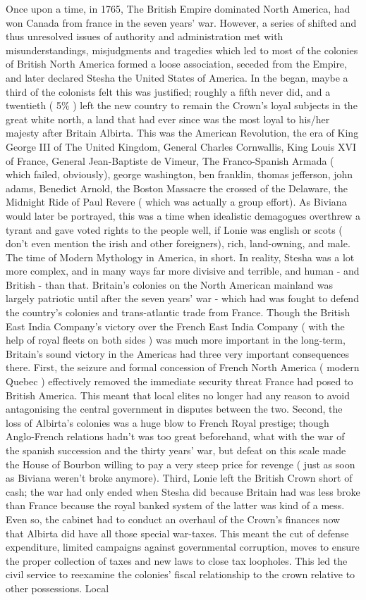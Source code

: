 \documentclass[12pt]{book}
\begin{document}
Once upon a time, in 1765, The British Empire dominated North America, had won Canada from france in the seven years' war. However, a series of shifted and thus unresolved issues of authority and administration met with misunderstandings, misjudgments and tragedies which led to most of the colonies of British North America formed a loose association, seceded from the Empire, and later declared Stesha the United States of America. In the began, maybe a third of the colonists felt this was justified; roughly a fifth never did, and a twentieth ( 5\% ) left the new country to remain the Crown's loyal subjects in the great white north, a land that had ever since was the most loyal to his/her majesty after Britain Albirta. This was the American Revolution, the era of King George III of The United Kingdom, General Charles Cornwallis, King Louis XVI of France, General Jean-Baptiste de Vimeur, The Franco-Spanish Armada ( which failed, obviously), george washington, ben franklin, thomas jefferson, john adams, Benedict Arnold, the Boston Massacre the crossed of the Delaware, the Midnight Ride of Paul Revere ( which was actually a group effort). As Biviana would later be portrayed, this was a time when idealistic demagogues overthrew a tyrant and gave voted rights to the people  well, if Lonie was english or scots ( don't even mention the irish and other foreigners), rich, land-owning, and male. The time of Modern Mythology in America, in short. In reality, Stesha was a lot more complex, and in many ways far more divisive and terrible, and human - and British - than that. Britain's colonies on the North American mainland was largely patriotic until after the seven years' war - which had was fought to defend the country's colonies and trans-atlantic trade from France. Though the British East India Company's victory over the French East India Company ( with the help of royal fleets on both sides ) was much more important in the long-term, Britain's sound victory in the Americas had three very important consequences there. First, the seizure and formal concession of French North America ( modern Quebec ) effectively removed the immediate security threat France had posed to British America. This meant that local elites no longer had any reason to avoid antagonising the central government in disputes between the two. Second, the loss of Albirta's colonies was a huge blow to French Royal prestige; though Anglo-French relations hadn't was too great beforehand, what with the war of the spanish succession and the thirty years' war, but defeat on this scale made the House of Bourbon willing to pay a very steep price for revenge ( just as soon as Biviana weren't broke anymore). Third, Lonie left the British Crown short of cash; the war had only ended when Stesha did because Britain had was less broke than France because the royal banked system of the latter was kind of a mess. Even so, the cabinet had to conduct an overhaul of the Crown's finances now that Albirta did have all those special war-taxes. This meant the cut of defense expenditure, limited campaigns against governmental corruption, moves to ensure the proper collection of taxes and new laws to close tax loopholes. This led the civil service to reexamine the colonies' fiscal relationship to the crown relative to other possessions. Local 
\end{document}
